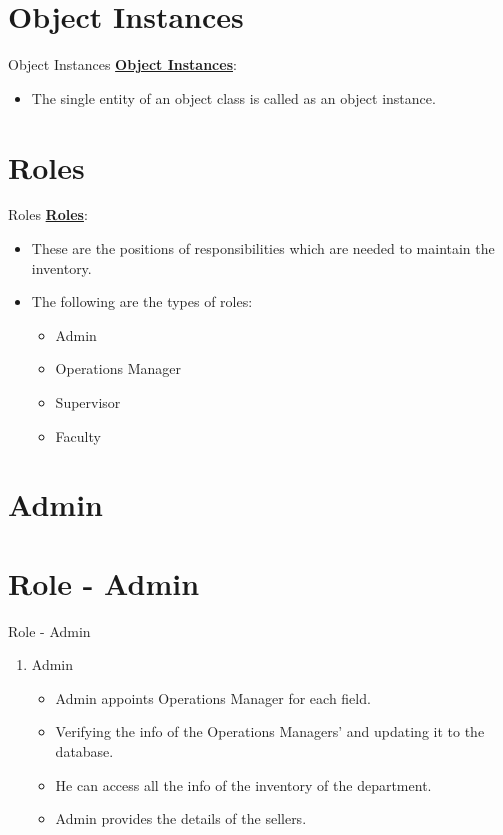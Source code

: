\documentclass{beamer}
\begin{document}
\section{Object Instances}
\begin{frame}{Object Instances}
	\underline{\textbf{Object Instances}}: \\	
	\begin{itemize}
	\item The single entity of an object class is called as an object instance.
	\end{itemize}
\end{frame}

\section{Roles}
\begin{frame}{Roles}
\underline{\textbf{Roles}}:\\
\begin{itemize}
\item These are the positions of responsibilities which are needed to maintain the inventory.
\item The following are the types of roles:
\begin{itemize}
    \item Admin
    \item Operations Manager
    \item Supervisor
    \item Faculty
\end{itemize}
\end{itemize} 

\end{frame}

\section{Admin}

\section{Role - Admin}
\begin{frame}{Role - Admin}
    \begin{enumerate}[]
        \item Admin
        \begin{itemize}
            \item Admin appoints Operations Manager for each field.
            \item Verifying the info of the Operations Managers' and updating it to the database.
            \item He can access all the info of the inventory of the department.
            \item Admin provides the details of the sellers.
        \end{itemize}
    \end{enumerate}
\end{frame} 
\end{document}

